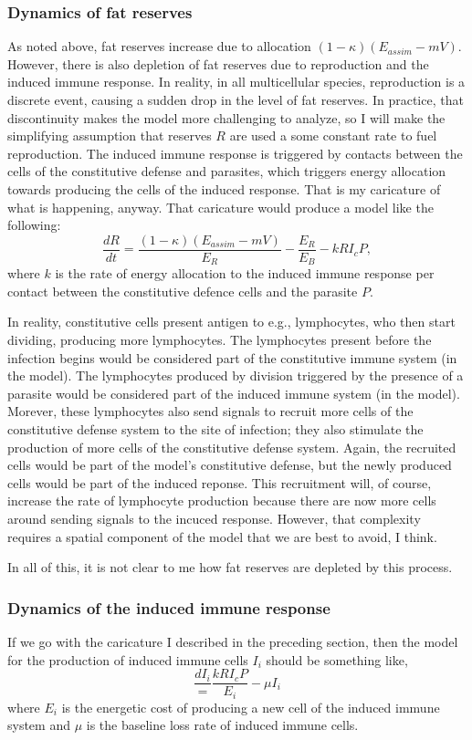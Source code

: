 \documentclass[11pt,reqno,final,pdftex]{amsart}\usepackage[]{graphicx}\usepackage[]{color}
\theoremstyle{plain}
\numberwithin{equation}{part}
\begin{document}
\subsubsection*{Dynamics of fat reserves}
As noted above, fat reserves increase due to allocation $(1-\kappa)(E_{assim}-mV)$.
However, there is also depletion of fat reserves due to reproduction and the induced immune response.
In reality, in all multicellular species, reproduction is a discrete event, causing a sudden drop in the level of fat reserves.
In practice, that discontinuity makes the model more challenging to analyze, so I will make the simplifying assumption that reserves $R$ are used a some constant rate to fuel reproduction.
The induced immune response is triggered by contacts between the cells of the constitutive defense and parasites, which triggers energy allocation towards producing the cells of the induced response.
That is my caricature of what is happening, anyway.
That caricature would produce a model like the following:
\begin{equation}
\frac{dR}{dt} = \frac{(1-\kappa)(E_{assim}-mV)}{E_R} - \frac{E_R}{E_B} - k R I_c P,
\end{equation}
where $k$ is the rate of energy allocation to the induced immune response per contact between the constitutive defence cells and the parasite $P$.

In reality, constitutive cells present antigen to e.g., lymphocytes, who then start dividing, producing more lymphocytes.
The lymphocytes present before the infection begins would be considered part of the constitutive immune system (in the model).
The lymphocytes produced by division triggered by the presence of a parasite would be considered part of the induced immune system (in the model).
Morever, these lymphocytes also send signals to recruit more cells of the constitutive defense system to the site of infection; they also stimulate the production of more cells of the constitutive defense system.
Again, the recruited cells would be part of the model's constitutive defense, but the newly produced cells would be part of the induced reponse.
This recruitment will, of course, increase the rate of lymphocyte production because there are now more cells around sending signals to the incuced response.
However, that complexity requires a spatial component of the model that we are best to avoid, I think.

In all of this, it is not clear to me how fat reserves are depleted by this process.

\subsubsection*{Dynamics of the induced immune response}
If we go with the caricature I described in the preceding section, then the model for the production of induced immune cells $I_i$ should be something like,
\begin{equation}
\frac{dI_i} = \frac{k R I_c P}{E_i} - \mu I_i
\end{equation}
where $E_i$ is the energetic cost of producing a new cell of the induced immune system and $\mu$ is the baseline loss rate of induced immune cells.






\end{document}
